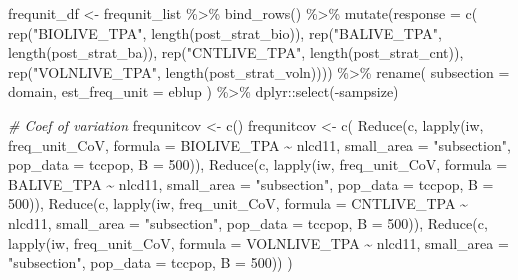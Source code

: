 \documentclass[12pt,twoside]{reedthesis}
\newenvironment{Shaded}{\begin{snugshade}}{\end{snugshade}}
\newcommand{\AttributeTok}[1]{\textcolor[rgb]{0.77,0.63,0.00}{#1}}
\newcommand{\CommentTok}[1]{\textcolor[rgb]{0.56,0.35,0.01}{\textit{#1}}}
\newcommand{\DecValTok}[1]{\textcolor[rgb]{0.00,0.00,0.81}{#1}}
\newcommand{\FunctionTok}[1]{\textcolor[rgb]{0.00,0.00,0.00}{#1}}
\newcommand{\NormalTok}[1]{#1}
\newcommand{\OtherTok}[1]{\textcolor[rgb]{0.56,0.35,0.01}{#1}}
\newcommand{\SpecialCharTok}[1]{\textcolor[rgb]{0.00,0.00,0.00}{#1}}
\newcommand{\StringTok}[1]{\textcolor[rgb]{0.31,0.60,0.02}{#1}}
\begin{document}
\begin{Shaded}
\begin{Highlighting}[]
\NormalTok{frequnit\_df }\OtherTok{\textless{}{-}}\NormalTok{ frequnit\_list }\SpecialCharTok{\%\textgreater{}\%}
  \FunctionTok{bind\_rows}\NormalTok{() }\SpecialCharTok{\%\textgreater{}\%}
  \FunctionTok{mutate}\NormalTok{(}\AttributeTok{response =} \FunctionTok{c}\NormalTok{(}
    \FunctionTok{rep}\NormalTok{(}\StringTok{"BIOLIVE\_TPA"}\NormalTok{, }\FunctionTok{length}\NormalTok{(post\_strat\_bio)),}
    \FunctionTok{rep}\NormalTok{(}\StringTok{"BALIVE\_TPA"}\NormalTok{, }\FunctionTok{length}\NormalTok{(post\_strat\_ba)),}
    \FunctionTok{rep}\NormalTok{(}\StringTok{"CNTLIVE\_TPA"}\NormalTok{, }\FunctionTok{length}\NormalTok{(post\_strat\_cnt)),}
    \FunctionTok{rep}\NormalTok{(}\StringTok{"VOLNLIVE\_TPA"}\NormalTok{, }\FunctionTok{length}\NormalTok{(post\_strat\_voln)))) }\SpecialCharTok{\%\textgreater{}\%}
  \FunctionTok{rename}\NormalTok{(}
    \AttributeTok{subsection =}\NormalTok{ domain,}
    \AttributeTok{est\_freq\_unit =}\NormalTok{ eblup}
\NormalTok{  ) }\SpecialCharTok{\%\textgreater{}\%}
\NormalTok{  dplyr}\SpecialCharTok{::}\FunctionTok{select}\NormalTok{(}\SpecialCharTok{{-}}\NormalTok{sampsize)}

\CommentTok{\# Coef of variation}
\NormalTok{frequnitcov }\OtherTok{\textless{}{-}} \FunctionTok{c}\NormalTok{()}
\NormalTok{frequnitcov }\OtherTok{\textless{}{-}} \FunctionTok{c}\NormalTok{(}
  \FunctionTok{Reduce}\NormalTok{(c,}
       \FunctionTok{lapply}\NormalTok{(iw,}
\NormalTok{       freq\_unit\_CoV,}
       \AttributeTok{formula =}\NormalTok{ BIOLIVE\_TPA }\SpecialCharTok{\textasciitilde{}}\NormalTok{ nlcd11,}
       \AttributeTok{small\_area =} \StringTok{"subsection"}\NormalTok{,}
       \AttributeTok{pop\_data =}\NormalTok{ tccpop,}
       \AttributeTok{B =} \DecValTok{500}\NormalTok{)),}
  \FunctionTok{Reduce}\NormalTok{(c,}
       \FunctionTok{lapply}\NormalTok{(iw,}
\NormalTok{       freq\_unit\_CoV,}
       \AttributeTok{formula =}\NormalTok{ BALIVE\_TPA }\SpecialCharTok{\textasciitilde{}}\NormalTok{ nlcd11,}
       \AttributeTok{small\_area =} \StringTok{"subsection"}\NormalTok{,}
       \AttributeTok{pop\_data =}\NormalTok{ tccpop,}
       \AttributeTok{B =} \DecValTok{500}\NormalTok{)),}
  \FunctionTok{Reduce}\NormalTok{(c,}
       \FunctionTok{lapply}\NormalTok{(iw,}
\NormalTok{       freq\_unit\_CoV,}
       \AttributeTok{formula =}\NormalTok{ CNTLIVE\_TPA }\SpecialCharTok{\textasciitilde{}}\NormalTok{ nlcd11,}
       \AttributeTok{small\_area =} \StringTok{"subsection"}\NormalTok{,}
       \AttributeTok{pop\_data =}\NormalTok{ tccpop,}
       \AttributeTok{B =} \DecValTok{500}\NormalTok{)),}
  \FunctionTok{Reduce}\NormalTok{(c,}
       \FunctionTok{lapply}\NormalTok{(iw,}
\NormalTok{       freq\_unit\_CoV,}
       \AttributeTok{formula =}\NormalTok{ VOLNLIVE\_TPA }\SpecialCharTok{\textasciitilde{}}\NormalTok{ nlcd11,}
       \AttributeTok{small\_area =} \StringTok{"subsection"}\NormalTok{,}
       \AttributeTok{pop\_data =}\NormalTok{ tccpop,}
       \AttributeTok{B =} \DecValTok{500}\NormalTok{))}
\NormalTok{)}


\end{Highlighting}
\end{Shaded}
\end{document}
